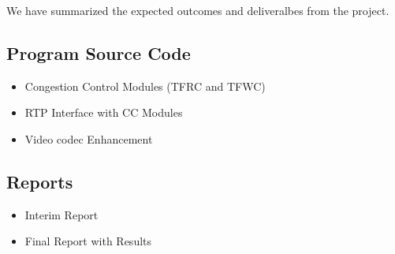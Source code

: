 
We have summarized the expected outcomes and deliveralbes from the project.

\subsection{\label{ssec:codes}Program Source Code}

\begin{itemize} 
\item Congestion Control Modules (TFRC and TFWC) 
\item RTP Interface with CC Modules 
\item Video codec Enhancement 
\end{itemize}

\subsection{\label{ssec:docs}Reports}


\begin{itemize}
\item Interim Report
\item Final Report with Results
\end{itemize}

\newpage
